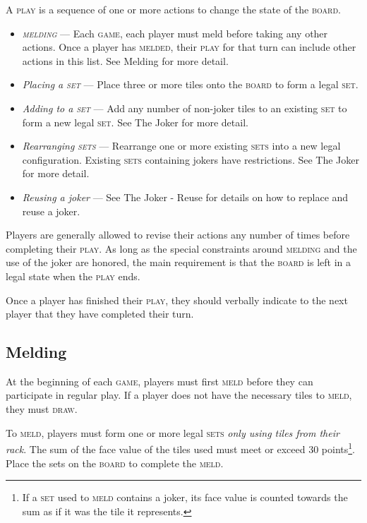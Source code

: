 \documentclass{article}
\begin{document}
\begin{multicols*}{3}
A \textsc{play} is a sequence of one or more actions to change the state of the
\textsc{board}.

\begin{itemize}
	\item \textit{\textsc{melding}} --- Each \textsc{game}, each player must
		meld before taking any other actions. Once a player has
		\textsc{melded}, their \textsc{play} for that turn can include
		other actions in this list. See Melding for more detail.
	\item \textit{Placing a \textsc{set}} --- Place three or more tiles onto
		the \textsc{board} to form a legal \textsc{set}.
	\item \textit{Adding to a \textsc{set}} --- Add any number of non-joker
		tiles to an existing \textsc{set} to form a new legal
		\textsc{set}. See The Joker for more detail.
	\item \textit{Rearranging \textsc{sets}} --- Rearrange one or more
		existing \textsc{sets} into a new legal configuration. Existing
		\textsc{sets} containing jokers have restrictions. See The Joker
		for more detail.
	\item \textit{Reusing a joker} --- See The Joker - Reuse for details on
		how to replace and reuse a joker.
\end{itemize}

Players are generally allowed to revise their actions any number of times before
completing their \textsc{play}. As long as the special constraints around
\textsc{melding} and the use of the joker are honored, the main requirement is
that the \textsc{board} is left in a legal state when the \textsc{play} ends.

Once a player has finished their \textsc{play}, they should verbally indicate to
the next player that they have completed their turn.

\subsection*{Melding}
\label{sec:melding}

At the beginning of each \textsc{game}, players must first \textsc{meld} before
they can participate in regular play. If a player does not have the necessary
tiles to \textsc{meld}, they must \textsc{draw}.

To \textsc{meld}, players must form one or more legal \textsc{sets} \textit{only
using tiles from their rack}. The sum of the face value of the tiles used must
meet or exceed 30 points\footnote{If a \textsc{set} used to \textsc{meld}
contains a joker, its face value is counted towards the sum as if it was the
tile it represents.}. Place the sets on the \textsc{board} to complete the
\textsc{meld}.


\end{multicols*}
\end{document}
